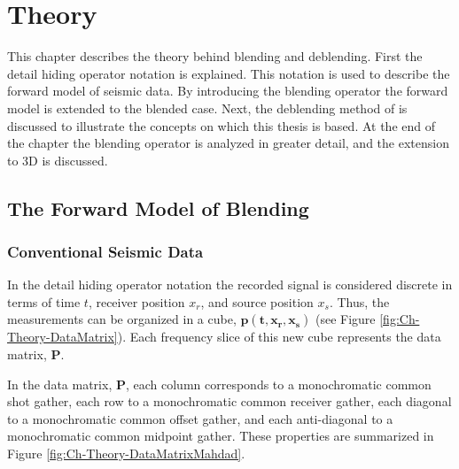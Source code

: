 \chapter{Theory} \label{chap:theory}

This chapter describes the theory behind blending and deblending. First the detail hiding operator notation is explained. This notation is used to describe the forward model of seismic data. By introducing the blending operator the forward model is extended to the blended case. Next, the deblending method of \citet{Mahdad-Deblending-Method} is discussed to illustrate the concepts on which this thesis is based. At the end of the chapter the blending operator is analyzed in greater detail, and the extension to 3D is discussed.

\section{The Forward Model of Blending} \label{sec:Ch-Theory-Operator}

\subsection{Conventional Seismic Data}
In the detail hiding operator notation \citep{Berkhout1982} the recorded signal is considered discrete in terms of time $t$, receiver position $x_r$, and source position $x_s$. Thus, the measurements can be organized in a cube, $\mathbf{p(t,x_r,x_s)}$ (see Figure \ref{fig:Ch-Theory-DataMatrix}). Each frequency slice of this new cube represents the data matrix, $\mathbf{P}$. 

In the data matrix, $\mathbf{P}$, each column corresponds to a monochromatic common shot gather, each row to a monochromatic common receiver gather, each diagonal to a monochromatic common offset gather, and each anti-diagonal to a monochromatic common midpoint gather. These properties are summarized in Figure \ref{fig:Ch-Theory-DataMatrixMahdad}. 

